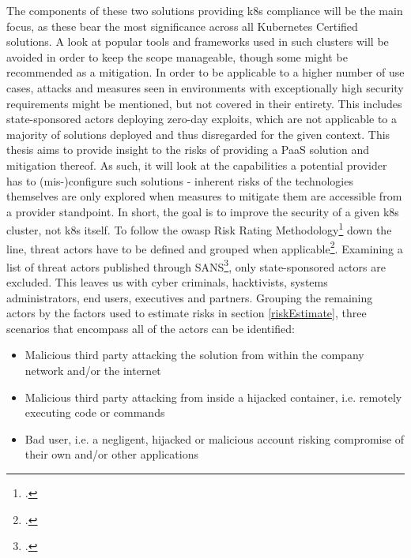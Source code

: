 The components of these two solutions providing \gls{k8s} compliance will be the main focus, as these bear the most significance across all Kubernetes Certified solutions. 
A look at popular tools and frameworks used in such clusters will be avoided in order to keep the scope manageable, though some might be recommended as a mitigation.
In order to be applicable to a higher number of use cases, attacks and measures seen in environments with exceptionally high security requirements might be mentioned, but not  covered in their entirety. This includes state-sponsored actors deploying zero-day exploits, which are not applicable to a majority of solutions deployed and thus disregarded for the given context.
This thesis aims to provide insight to the risks of providing a PaaS solution and mitigation thereof. 
As such, it will look at the capabilities a potential provider has to (mis-)configure such solutions - inherent risks of the technologies themselves are only explored when measures to mitigate them are accessible from a provider standpoint. 
In short, the goal is to improve the security of a given \gls{k8s} cluster, not \gls{k8s} itself.
To follow the \gls{owasp} Risk Rating Methodology\footcite{riskRating} down the line, threat actors have to be defined and grouped when applicable\footcite[][, Section 'Define all possible threats']{threatModeling}. Examining a list of threat actors published through SANS\footcite[][p. 12 to 17]{sansThreatActors}, only state-sponsored actors are excluded. This leaves us with cyber criminals, hacktivists, systems administrators, end users, executives and partners.
Grouping the remaining actors by the factors used to estimate risks in section \ref{riskEstimate}, three scenarios that encompass all of the actors can be identified:
\begin{itemize}

\item Malicious third party attacking the solution from within the company network and/or the internet

\item Malicious third party attacking from inside a hijacked container, i.e. remotely executing code or commands

\item Bad user, i.e. a negligent, hijacked or malicious account risking compromise of their own and/or other applications

\end{itemize}

